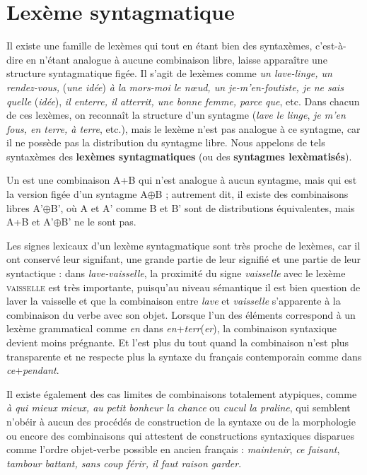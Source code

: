 \section{Lexème syntagmatique}\label{sec:3.1.12}

Il existe une famille de lexèmes qui tout en étant bien des syntaxèmes, c’est-à-dire en n’étant analogue à aucune combinaison libre, laisse apparaître une structure syntagmatique figée. Il s’agit de lexèmes comme \textit{un lave-linge, un rendez-vous,} (\textit{une idée}) \textit{à la mors-moi le nœud, un je-m’en-foutiste, je ne sais quelle} (\textit{idée}), \textit{il enterre, il atterrit, une bonne femme, parce que}, etc. Dans chacun de ces lexèmes, on reconnaît la structure d’un syntagme (\textit{lave le linge}, \textit{je m’en fous, en terre, à terre}, etc.), mais le lexème n’est pas analogue à ce syntagme, car il ne possède pas la distribution du syntagme libre. Nous appelons de tels syntaxèmes des \textbf{lexèmes syntagmatiques} (ou des \textbf{syntagmes lexèmatisés}).

{Un  est une combinaison A+B qui n’est analogue à aucun syntagme, mais qui est la version figée d’un syntagme A${\oplus}$B ; autrement dit, il existe des combinaisons libres A’${\oplus}$B’, où A et A’ comme B et B’ sont de distribu\-tions équivalentes, mais A+B et A’${\oplus}$B’ ne le sont pas.}

Les signes lexicaux d’un lexème syntagmatique sont très proche de lexèmes, car il ont conservé leur signifant, une grande partie de leur signifié et une partie de leur syntactique : dans \textit{lave-vaisselle}, la proximité du signe \textit{vaisselle} avec le lexème \textsc{vaisselle} est très importante, puisqu’au niveau sémantique il est bien question de laver la vaisselle et que la combinaison entre \textit{lave} et \textit{vaisselle} s’apparente à la combinaison du verbe avec son objet. Lorsque l’un des éléments correspond à un lexème grammatical comme \textit{en} dans \textit{en}+\textit{terr}(\textit{er}), la combinaison syntaxique devient moins prégnante. Et l’est plus du tout quand la combinaison n’est plus transparente et ne respecte plus la syntaxe du français contemporain comme dans \textit{ce}+\textit{pendant}.

Il existe également des cas limites de combinaisons totalement atypiques, comme \textit{à qui mieux mieux, au petit bonheur la chance} ou \textit{cucul la praline}, qui semblent n’obéir à aucun des procédés de construction de la syntaxe ou de la morphologie ou encore des combinaisons qui attestent de constructions syntaxiques disparues comme l’ordre objet-verbe possible en ancien français : \textit{maintenir}, \textit{ce faisant}, \textit{tambour battant, sans coup férir, il faut raison garder}.

